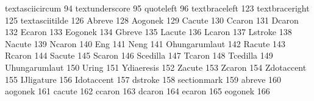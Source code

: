  textasciicircum  94
 textunderscore   95
 quoteleft        96
 textbraceleft   123
 textbraceright  125
 textasciitilde  126
 Abreve          128 %
 Aogonek         129 %
 Cacute          130 %
 Ccaron          131 %
 Dcaron          132 %
 Ecaron          133 %
 Eogonek         134 %
 Gbreve          135 %
 Lacute          136 %
 Lcaron          137 %
 Lstroke         138 %
 Nacute          139 %
 Ncaron          140 %
 Eng             141 %
 Neng            141 %
 Ohungarumlaut   142 %
 Racute          143 %
 Rcaron          144 %
 Sacute          145 %
 Scaron          146 %
 Scedilla        147 %
 Tcaron          148 %
 Tcedilla        149 %
 Uhungarumlaut   150 %
 Uring           151 %
 Ydiaeresis      152 %
 Zacute          153 %
 Zcaron          154 %
 Zdotaccent      155 %
 IJligature      156 %
 Idotaccent      157
 dstroke         158 %
 sectionmark     159
 abreve          160 %
 aogonek         161 %
 cacute          162 %
 ccaron          163 %
 dcaron          164 %
 ecaron          165 %
 eogonek         166 %
